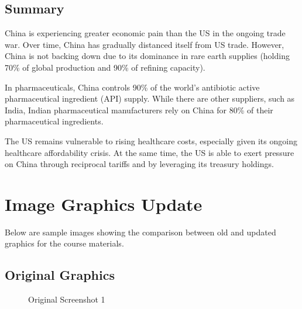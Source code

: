 \documentclass[
  11pt,
]{article}
\begin{document}
\subsection{Summary}\label{summary}

China is experiencing greater economic pain than the US in the ongoing
trade war. Over time, China has gradually distanced itself from US
trade. However, China is not backing down due to its dominance in rare
earth supplies (holding 70\% of global production and 90\% of refining
capacity).

In pharmaceuticals, China controls 90\% of the world's antibiotic active
pharmaceutical ingredient (API) supply. While there are other suppliers,
such as India, Indian pharmaceutical manufacturers rely on China for
80\% of their pharmaceutical ingredients.

The US remains vulnerable to rising healthcare costs, especially given
its ongoing healthcare affordability crisis. At the same time, the US is
able to exert pressure on China through reciprocal tariffs and by
leveraging its treasury holdings.

\section{Image Graphics Update}\label{image-graphics-update}

Below are sample images showing the comparison between old and updated
graphics for the course materials.

\subsection{Original Graphics}\label{original-graphics}

\begin{figure}[H]


\caption{\label{fig-old1}Original Screenshot 1}

\end{figure}%
\end{document}
